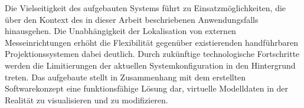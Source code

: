 Die Vielseitigkeit des aufgebauten Systems führt zu Einsatzmöglichkeiten, die über den Kontext des in dieser Arbeit beschriebenen Anwendungsfalls hinausgehen. Die Unabhängigkeit der Lokalisation von externen Messeinrichtungen erhöht die Flexibilität gegenüber existierenden handführbaren Projektionssystemen dabei deutlich. Durch zukünftige technologische Fortschritte werden die Limitierungen der aktuellen Systemkonfiguration in den Hintergrund treten. Das aufgebaute \kps{} stellt in Zusammenhang mit dem erstellten Softwarekonzept eine funktionsfähige Lösung dar, virtuelle Modelldaten in der Realität zu visualisieren und zu modifizieren.


%
%



